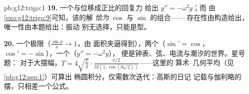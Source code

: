 \begin{solution}{pb:g12:trigo:1}
\textbf{19.} 一个与位移成正比的回复力
给出 $y'' = -\omega^2 y$；而
由\cref{exo:g12:trigo:9}可知，该的解
\emph{恰为} $\cos$ 与 $\sin$ 的组合——
存在性由构造给出，唯一性由本题给出：振动
别无选择，只能是型。

\textbf{20.} 一个极限（$\frac{\sin x}{x} \to 1$，由
面积夹逼得到），两个（$\sin' = \cos$，
$\cos' = -\sin$），一个（$y'' = -\omega^2 y$），
便是钟表、弦、电流与潮汐的世界。星号题：
对于大摆幅，$T = 4\sqrt{\frac Lg} \cdot
\frac{\pi/2}{M(1, \cos(\theta_0/2))}$——这里的
算术–几何平均（见\cref{pb:g12:seq:1}）可算出
椭圆积分，仅需数次迭代：高斯的日记
记载与伽利略的摆，只相差一个公式。
\end{solution}
